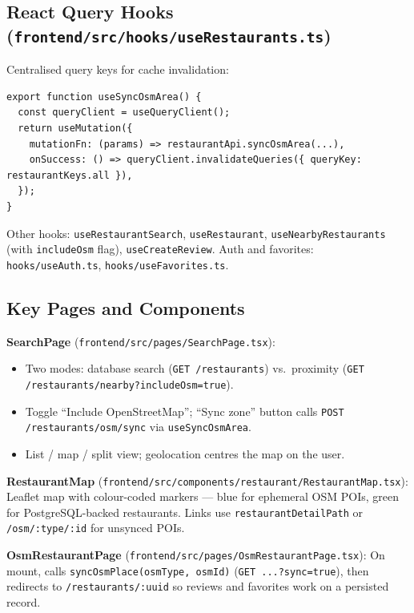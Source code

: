 \documentclass[11pt,a4paper]{article}
\begin{document}
\subsection{React Query Hooks (\texttt{frontend/src/hooks/useRestaurants.ts})}

Centralised query keys for cache invalidation:

\begin{lstlisting}
export function useSyncOsmArea() {
  const queryClient = useQueryClient();
  return useMutation({
    mutationFn: (params) => restaurantApi.syncOsmArea(...),
    onSuccess: () => queryClient.invalidateQueries({ queryKey: restaurantKeys.all }),
  });
}
\end{lstlisting}

Other hooks: \texttt{useRestaurantSearch}, \texttt{useRestaurant}, \texttt{useNearbyRestaurants}
(with \texttt{includeOsm} flag), \texttt{useCreateReview}.
Auth and favorites: \texttt{hooks/useAuth.ts}, \texttt{hooks/useFavorites.ts}.

\subsection{Key Pages and Components}

\textbf{SearchPage} (\texttt{frontend/src/pages/SearchPage.tsx}):
\begin{itemize}
  \item Two modes: database search (\texttt{GET /restaurants}) vs.\ proximity
        (\texttt{GET /restaurants/nearby?includeOsm=true}).
  \item Toggle ``Include OpenStreetMap''; ``Sync zone'' button calls
        \texttt{POST /restaurants/osm/sync} via \texttt{useSyncOsmArea}.
  \item List / map / split view; geolocation centres the map on the user.
\end{itemize}

\textbf{RestaurantMap} (\texttt{frontend/src/components/restaurant/RestaurantMap.tsx}):
Leaflet map with colour-coded markers --- blue for ephemeral OSM POIs,
green for PostgreSQL-backed restaurants. Links use \texttt{restaurantDetailPath}
or \texttt{/osm/:type/:id} for unsynced POIs.

\textbf{OsmRestaurantPage} (\texttt{frontend/src/pages/OsmRestaurantPage.tsx}):
On mount, calls \texttt{syncOsmPlace(osmType, osmId)} (\texttt{GET ...?sync=true}),
then redirects to \texttt{/restaurants/:uuid} so reviews and favorites work on a
persisted record.
\end{document}
